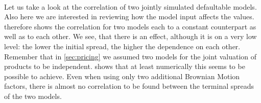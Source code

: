 \documentclass[12pt]{article}
\begin{document}
	\\Let us take a look at the correlation of two jointly simulated defaultable models. Also here we are interested in reviewing how the model input affects the values.  therefore shows the correlation for two models each to a constant counterpart as well as to each other. We see, that there is an effect, although it is on a very low level: the lower the initial spread, the higher the dependence on each other.\\
	Remember that in \cref{sec:pricing} we assumed two models for the joint valuation of products to be independent.  shows that at least numerically this seems to be possible to achieve. Even when using only two additional Brownian Motion factors, there is almost no correlation to be found between the terminal spreads of the two models.
	
\end{document}
